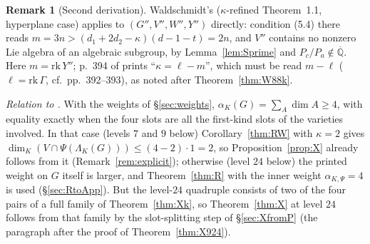 \documentclass[11pt]{amsart}
\theoremstyle{definition}
\newtheorem{remark}[theorem]{Remark}
\newcommand{\Qb}{\overline{\mathbb{Q}}}
\begin{document}
\begin{remark}[Second derivation]\label{rem:X5d}
Waldschmidt's \cite[\S5d]{W88} ($\kappa$-refined Theorem~1.1, hyperplane case) applies to $(G'',V'',W'',Y'')$ directly:
condition (5.4) there reads $m=3n>(d_1+2d_2-\kappa)(d-1-t)=2n$, and $V''$ contains no nonzero Lie algebra of an algebraic
subgroup, by Lemma~\ref{lem:Sprime} and $P_c/P_a\notin\Qb$. Here $m=\mathrm{rk}\,Y''$; p.~394 of \cite{W88} prints
``$\kappa=\ell-m$'', which must be read $m-\ell$ ($\ell=\mathrm{rk}\,\Gamma$, cf.\ pp.~392--393), as noted after Theorem~\ref{thm:W88k}.

\emph{Relation to \cite[Th\'eor\`eme (iii)]{RW93}.} With the weights of \S\ref{sec:weights}, $\alpha_K(G)=\sum_A\dim A\ge4$, with
equality exactly when the four slots are all the first-kind slots of the varieties involved. In that case (levels $7$ and
$9$ below) Corollary~\ref{thm:RW} with $\kappa=2$ gives $\dim_K(V\cap\Psi(\Lambda_K(G)))\le(4-2)\cdot1=2$, so
Proposition~\ref{prop:X} already follows from it (Remark~\ref{rem:explicit}); otherwise (level $24$ below) the printed
weight on $G$ itself is larger, and Theorem~\ref{thm:R} with the inner weight $\alpha_{K,\Psi}=4$ is used
(\S\ref{sec:RtoApp}). But the level-$24$ quadruple consists of two of the four pairs of a
full family of Theorem~\ref{thm:Xk}, so Theorem~\ref{thm:X} at level $24$ follows from that family by the slot-splitting
step of \S\ref{sec:XfromP} (the paragraph after the proof of Theorem~\ref{thm:X924}).
\end{remark}
\end{document}
